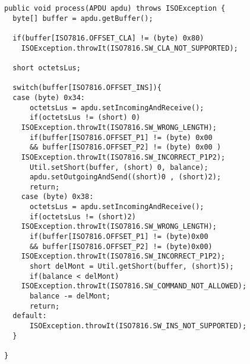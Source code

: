 \begin{verbatim}
public void process(APDU apdu) throws ISOException {
  byte[] buffer = apdu.getBuffer();
      
  if(buffer[ISO7816.OFFSET_CLA] != (byte) 0x80)
    ISOException.throwIt(ISO7816.SW_CLA_NOT_SUPPORTED);
      
  short octetsLus;
      
  switch(buffer[ISO7816.OFFSET_INS]){
  case (byte) 0x34:
      octetsLus = apdu.setIncomingAndReceive();
      if(octetsLus != (short) 0)
	ISOException.throwIt(ISO7816.SW_WRONG_LENGTH);
      if(buffer[ISO7816.OFFSET_P1] != (byte) 0x00 
	  && buffer[ISO7816.OFFSET_P2] != (byte) 0x00 )
	ISOException.throwIt(ISO7816.SW_INCORRECT_P1P2);
      Util.setShort(buffer, (short) 0, balance);
      apdu.setOutgoingAndSend((short)0 , (short)2);
      return;
    case (byte) 0x38:
      octetsLus = apdu.setIncomingAndReceive();
      if(octetsLus != (short)2)
	ISOException.throwIt(ISO7816.SW_WRONG_LENGTH);
      if(buffer[ISO7816.OFFSET_P1] != (byte)0x00 
	  && buffer[ISO7816.OFFSET_P2] != (byte)0x00)
	ISOException.throwIt(ISO7816.SW_INCORRECT_P1P2);
      short delMont = Util.getShort(buffer, (short)5);
      if(balance < delMont)
	ISOException.throwIt(ISO7816.SW_COMMAND_NOT_ALLOWED);
      balance -= delMont;
      return;
  default:
      ISOException.throwIt(ISO7816.SW_INS_NOT_SUPPORTED);
  }

}
\end{verbatim}



